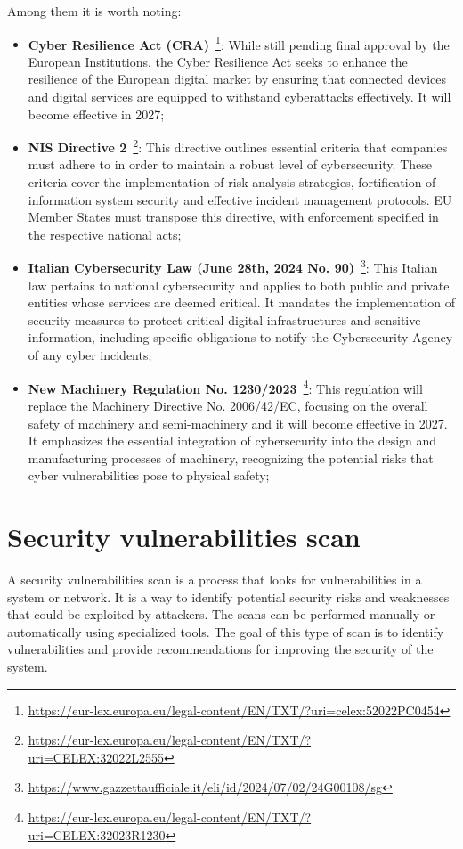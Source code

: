 Among them it is worth noting:~\cite{cybersecurity-standards-regulations-compliance}
\begin{itemize}
  \item \textbf{Cyber Resilience Act (CRA)}~\footnote{\url{https://eur-lex.europa.eu/legal-content/EN/TXT/?uri=celex:52022PC0454}}: While still pending final approval by the European Institutions, the Cyber Resilience Act seeks to enhance the resilience of the European digital market by ensuring that connected devices and digital services are equipped to withstand cyberattacks effectively. It will become effective in 2027;
  \item  \textbf{NIS Directive 2}~\footnote{\url{https://eur-lex.europa.eu/legal-content/EN/TXT/?uri=CELEX:32022L2555}}: This directive outlines essential criteria that companies must adhere to in order to maintain a robust level of cybersecurity. These criteria cover the implementation of risk analysis strategies, fortification of information system security and effective incident management protocols. EU Member States must transpose this directive, with enforcement specified in the respective national acts;
  \item \textbf{Italian Cybersecurity Law (June 28th, 2024 No. 90)}~\footnote{\url{https://www.gazzettaufficiale.it/eli/id/2024/07/02/24G00108/sg}}: This Italian law pertains to national cybersecurity and applies to both public and private entities whose services are deemed critical. It mandates the implementation of security measures to protect critical digital infrastructures and sensitive information, including specific obligations to notify the Cybersecurity Agency of any cyber incidents;
  \item \textbf{New Machinery Regulation No. 1230/2023}~\footnote{\url{https://eur-lex.europa.eu/legal-content/EN/TXT/?uri=CELEX:32023R1230}}: This regulation will replace the Machinery Directive No. 2006/42/EC, focusing on the overall safety of machinery and semi-machinery and it will become effective in 2027. It emphasizes the essential integration of cybersecurity into the design and manufacturing processes of machinery, recognizing the potential risks that cyber vulnerabilities pose to physical safety;
\end{itemize}

\section{Security vulnerabilities scan}

A security vulnerabilities scan is a process that looks for vulnerabilities in a system or network. It is a way to identify potential security risks and weaknesses that could be exploited by attackers. The scans can be performed manually or automatically using specialized tools. The goal of this type of scan is to identify vulnerabilities and provide recommendations for improving the security of the system.

